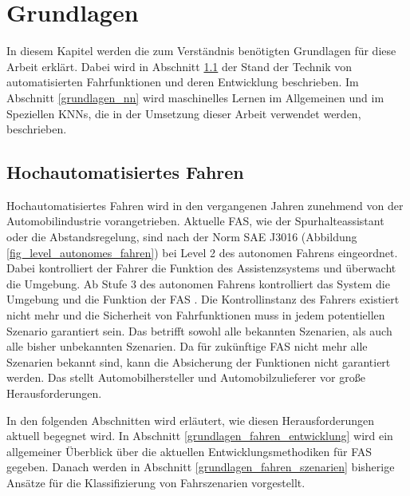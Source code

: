 
\chapter{Grundlagen}
\label{grundlagen}

In diesem Kapitel werden die zum Verständnis benötigten Grundlagen für diese Arbeit erklärt. Dabei wird in Abschnitt \ref{grundlagen_fahren} der Stand der Technik von automatisierten Fahrfunktionen und deren Entwicklung beschrieben. Im Abschnitt \ref{grundlagen_nn} wird maschinelles Lernen im Allgemeinen und im Speziellen \acp{KNN}, die in der Umsetzung dieser Arbeit verwendet werden, beschrieben.

\section{Hochautomatisiertes Fahren}
\label{grundlagen_fahren}

Hochautomatisiertes Fahren wird in den vergangenen Jahren zunehmend von der Automobilindustrie vorangetrieben. Aktuelle \ac{FAS}, wie der Spurhalteassistant oder die Abstandsregelung, sind nach der Norm SAE J3016 (Abbildung \ref{fig_level_autonomes_fahren}) bei Level 2 des autonomen Fahrens eingeordnet. Dabei kontrolliert der Fahrer die Funktion des Assistenzsystems und überwacht die Umgebung. Ab Stufe 3 des autonomen Fahrens kontrolliert das System die Umgebung und die Funktion der \ac{FAS} \cite{sae2014taxonomy}. Die Kontrollinstanz des Fahrers existiert nicht mehr und die Sicherheit von Fahrfunktionen muss in jedem potentiellen Szenario garantiert sein. Das betrifft sowohl alle bekannten Szenarien, als auch alle bisher unbekannten Szenarien. Da für zukünftige \ac{FAS} nicht mehr alle Szenarien bekannt sind, kann die Absicherung der Funktionen nicht garantiert werden. Das stellt Automobilhersteller und Automobilzulieferer vor große Herausforderungen.

In den folgenden Abschnitten wird erläutert, wie diesen Herausforderungen aktuell begegnet wird. In Abschnitt \ref{grundlagen_fahren_entwicklung} wird ein allgemeiner Überblick über die aktuellen Entwicklungsmethodiken für \ac{FAS} gegeben. Danach werden in Abschnitt \ref{grundlagen_fahren_szenarien} bisherige Ansätze für die Klassifizierung von Fahrszenarien vorgestellt.

